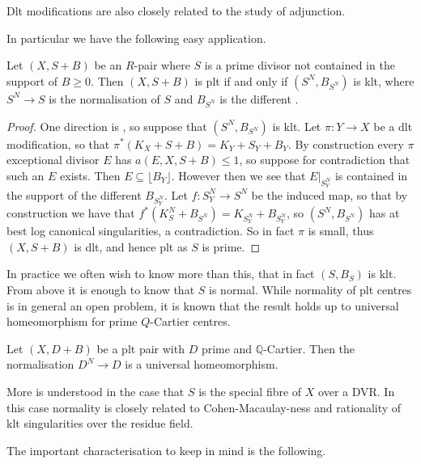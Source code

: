 \documentclass[a4paper,12pt]{book}
\begin{document}
Dlt modifications are also closely related to the study of adjunction.

In particular we have the following easy application.

\begin{theorem}
	Let $(X,S+B)$ be an $R$-pair where $S$ is a prime divisor not contained in the support of $B \geq 0$. Then $(X,S+B)$ is plt if and only if $(S^{N},B_{S^{N}})$ is klt, where $S^{N} \to S$ is the normalisation of $S$ and $B_{S^{N}}$ is the different \cite{}. 
\end{theorem}

\begin{proof}
	One direction is \cite{}, so suppose that $(S^{N},B_{S^{N}})$ is klt. Let $\pi:Y \to X$ be a dlt modification, so that $\pi^{*}(K_{X}+S+B)=K_{Y}+S_{Y}+B_{Y}$. By construction every $\pi$ exceptional divisor $E$ has $a(E,X,S+B) \leq 1$, so suppose for contradiction that such an $E$ exists. Then $E \subseteq \lfloor B_{Y} \rfloor$. However then we see that $E|_{S_{Y}^{N}}$ is contained in the support of the different $B_{S_{Y}^{N}}$. Let $f:S_{Y}^{N} \to S^{N}$ be the induced map, so that by construction we have that $f^{*}(K_{S}^{N}+B_{S^{N}})=K_{S_{Y}^{N}}+B_{S_{Y}^{N}}$, so $(S^{N},B_{S^{N}})$ has at best log canonical singularities, a contradiction. So in fact $\pi$ is small, thus $(X,S+B)$ is dlt, and hence plt as $S$ is prime.
\end{proof}

In practice we often wish to know more than this, that in fact $(S,B_{S})$ is klt. From above it is enough to know that $S$ is normal. While normality of plt centres is in general an open problem, it is known that the result holds up to universal homeomorphism for prime $Q$-Cartier centres.

\begin{lemma}\cite[Lemma 2.1]{hacon2020relative}\label{plt-universal}
	
	Let $(X,D+B)$ be a plt pair with $D$ prime and $\mathbb{Q}$-Cartier. Then the normalisation $D^{N} \to D$ is a universal homeomorphism.
	
	\end{lemma}

More is understood in the case that $S$ is the special fibre of $X$ over a DVR. In this case normality is closely related to Cohen-Macaulay-ness and rationality of klt singularities over the residue field.

The important characterisation to keep in mind is the following.
\end{document}

